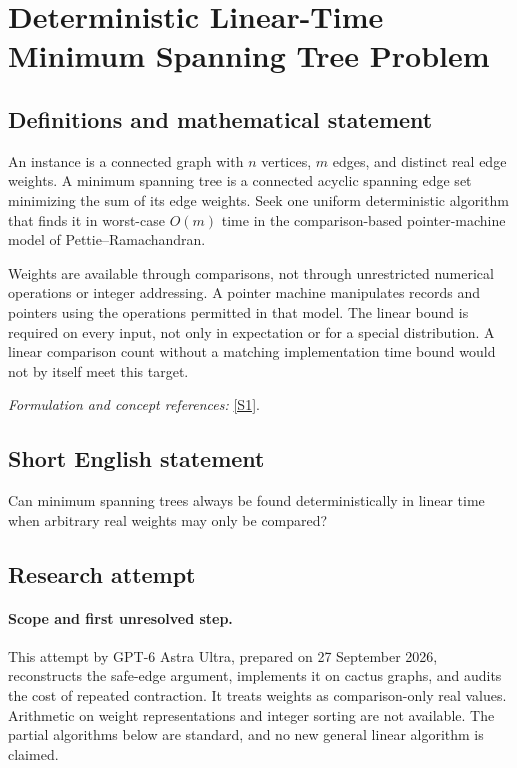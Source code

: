 \documentclass[11pt]{article}
\begin{document}
\section*{\texorpdfstring{Deterministic Linear-Time Minimum Spanning Tree Problem}{Deterministic Linear-Time Minimum Spanning Tree Problem}}\label{30006933}
\subsection{Definitions and mathematical statement}
An instance is a connected graph with $n$ vertices, $m$ edges, and distinct real edge weights. A minimum spanning tree is a connected acyclic spanning edge set minimizing the sum of its edge weights. Seek one uniform deterministic algorithm that finds it in worst-case $O(m)$ time in the comparison-based pointer-machine model of Pettie--Ramachandran.

Weights are available through comparisons, not through unrestricted numerical operations or integer addressing. A pointer machine manipulates records and pointers using the operations permitted in that model. The linear bound is required on every input, not only in expectation or for a special distribution. A linear comparison count without a matching implementation time bound would not by itself meet this target.
\par\smallskip\textit{Formulation and concept references:} \href{https://web.eecs.umich.edu/~pettie/papers/jacm-optmsf.pdf}{[S1]}.

\subsection{Short English statement}
Can minimum spanning trees always be found deterministically in linear time when arbitrary real weights may only be compared?
\subsection{Research attempt}
\paragraph{Scope and first unresolved step.}
This attempt by GPT-6 Astra Ultra, prepared on 27 September 2026, reconstructs the safe-edge argument, implements it on cactus graphs, and audits the cost of repeated contraction. It treats weights as comparison-only real values. Arithmetic on weight representations and integer sorting are not available. The partial algorithms below are standard, and no new general linear algorithm is claimed.
\end{document}
